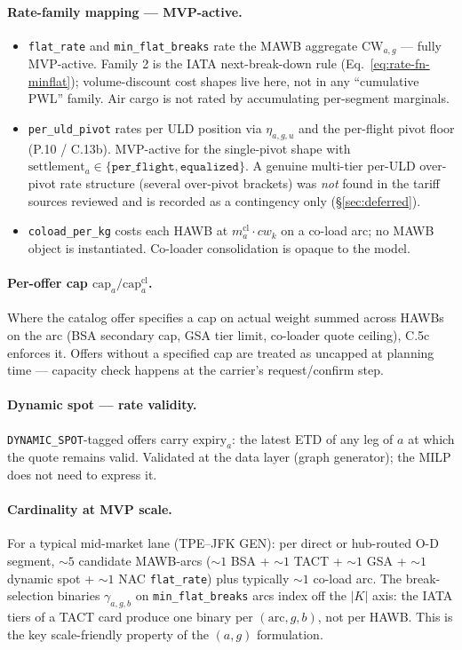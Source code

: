 \documentclass[11pt,a4paper]{article}
\theoremstyle{definition}
\begin{document}
\paragraph{Rate-family mapping --- MVP-active.}
\begin{itemize}[noitemsep]
  \item \texttt{flat\_rate} and \texttt{min\_flat\_breaks} rate the MAWB
        aggregate $\text{CW}_{a,g}$ --- fully MVP-active. Family 2 is the IATA
        next-break-down rule (Eq.~\ref{eq:rate-fn-minflat}); volume-discount
        cost shapes live here, not in any ``cumulative PWL'' family. Air cargo
        is not rated by accumulating per-segment marginals.
  \item \texttt{per\_uld\_pivot} rates per ULD position via $\eta_{a,g,u}$ and
        the per-flight pivot floor (P.10 / C.13b). MVP-active for the
        single-pivot shape with $\text{settlement}_a \in \{\texttt{per\_flight},
        \texttt{equalized}\}$. A genuine multi-tier per-ULD over-pivot rate
        structure (several over-pivot brackets) was \emph{not} found in the
        tariff sources reviewed and is recorded as a contingency only
        (\S\ref{sec:deferred}).
  \item \texttt{coload\_per\_kg} costs each HAWB at $m_a^{\text{cl}} \cdot
        cw_k$ on a co-load arc; no MAWB object is instantiated. Co-loader
        consolidation is opaque to the model.
\end{itemize}

\paragraph{Per-offer cap $\text{cap}_a / \text{cap}_a^{\text{cl}}$.}
Where the catalog offer specifies a cap on actual weight summed across HAWBs
on the arc (BSA secondary cap, GSA tier limit, co-loader quote ceiling), C.5c
enforces it. Offers without a specified cap are treated as uncapped at
planning time --- capacity check happens at the carrier's request/confirm step.

\paragraph{Dynamic spot --- rate validity.}
\texttt{DYNAMIC\_SPOT}-tagged offers carry $\text{expiry}_a$: the latest ETD
of any leg of $a$ at which the quote remains valid. Validated at the data
layer (graph generator); the MILP does not need to express it.

\paragraph{Cardinality at MVP scale.}
For a typical mid-market lane (TPE--JFK GEN): per direct or hub-routed O-D
segment, $\sim 5$ candidate MAWB-arcs ($\sim 1$ BSA + $\sim 1$ TACT + $\sim 1$
GSA + $\sim 1$ dynamic spot + $\sim 1$ NAC \texttt{flat\_rate}) plus typically
$\sim 1$ co-load arc. The break-selection binaries $\gamma_{a,g,b}$ on
\texttt{min\_flat\_breaks} arcs index off the $|K|$ axis: the IATA tiers of a
TACT card produce one binary per $(\text{arc}, g, b)$, not per HAWB. This is
the key scale-friendly property of the $(a, g)$ formulation.
\end{document}

